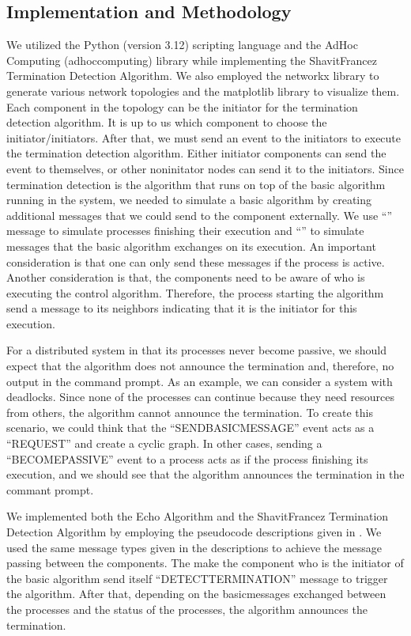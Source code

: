 \documentclass[letterpaper,10pt,english]{sphinxmanual}
\begin{document}
\subsection{Implementation and Methodology}
\label{\detokenize{docs/ShavitFrancez/results:implementation-and-methodology}}
\sphinxAtStartPar
We utilized the Python (version 3.12) scripting language and the Ad\sphinxhyphen{}Hoc Computing (adhoccomputing) library while implementing the Shavit\sphinxhyphen{}Francez Termination Detection Algorithm. We also employed the networkx library to generate various network topologies and the matplotlib library to visualize them. Each component in the topology can be the initiator for the termination detection algorithm. It is up to us which component to choose the initiator/initiators. After that, we must send an event to the initiators to execute the termination detection algorithm. Either initiator components can send the event to themselves, or other non\sphinxhyphen{}initator nodes can send it to the initiators. Since termination detection is the algorithm that runs on top of the basic algorithm running in the system, we needed to simulate a basic algorithm by creating additional messages that we could send to the component externally. We use “” message to simulate processes finishing their execution and “” to simulate messages that the basic algorithm exchanges on its execution. An important consideration is that one can only send these messages if the process is active. Another consideration is that, the components need to be aware of who is executing the control algorithm. Therefore, the process starting the algorithm send a message to its neighbors indicating that it is the initiator for this execution.

\sphinxAtStartPar
For a distributed system in that its processes never become passive, we should expect that the algorithm does not announce the termination and, therefore, no output in the command prompt. As an example, we can consider a system with deadlocks. Since none of the processes can continue because they need resources from others, the algorithm cannot announce the termination. To create this scenario, we could think that the “SENDBASICMESSAGE” event acts as a “REQUEST” and create a cyclic graph. In other cases, sending a “BECOMEPASSIVE” event to a process acts as if the process finishing its execution, and we should see that the algorithm announces the termination in the commant prompt.

\sphinxAtStartPar
We implemented both the Echo Algorithm and the Shavit\sphinxhyphen{}Francez Termination Detection Algorithm by employing the pseudocode descriptions given in . We used the same message types given in the descriptions to achieve the message passing between the components. The make the component who is the initiator of the basic algorithm send itself “DETECTTERMINATION” message to trigger the algorithm. After that, depending on the basic\sphinxhyphen{}messages exchanged between the processes and the status of the processes, the algorithm announces the termination.
\end{document}
